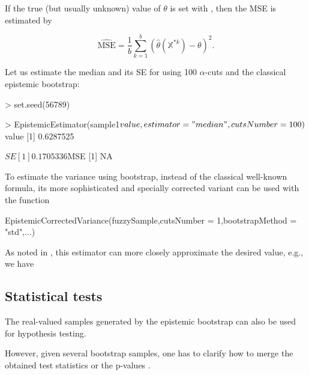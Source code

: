 If the true (but usually unknown) value of $\theta$ is set with , then the MSE is estimated by

\begin{equation}
\label{frachetmse}
	\widehat{\mathrm{MSE}}=\frac{1}{b} \sum_{k=1}^{b} \left ( \hat{\theta} \left (\mathbb{X}^{*k} \right) - \theta \right )^2 .
\end{equation}

Let us estimate the median and its SE for  using 100 $\alpha$-cuts and the classical epistemic bootstrap:

\begin{example}
> set.seed(56789)

> EpistemicEstimator(sample1$value, estimator = "median",cutsNumber = 100)

$value
[1] 0.6287525

$SE
[1] 0.1705336

$MSE
[1] NA
\end{example} 

To estimate the variance using bootstrap, instead of the classical well-known formula, its more sophisticated and specially corrected variant \citep{pgmr2022} can be used with the function

\begin{example}
EpistemicCorrectedVariance(fuzzySample,cutsNumber = 1,bootstrapMethod = "std",...)
\end{example}

As noted in \cite{pgmr2022}, this estimator can more closely approximate the desired value, e.g., we have



\subsection{Statistical tests}

The real-valued samples generated by the epistemic bootstrap can also be used for hypothesis testing. 

However, given several bootstrap samples, one has to clarify how to merge the obtained test statistics or the p-values \citep{10.1007/978-3-031-08974-9_39}.

